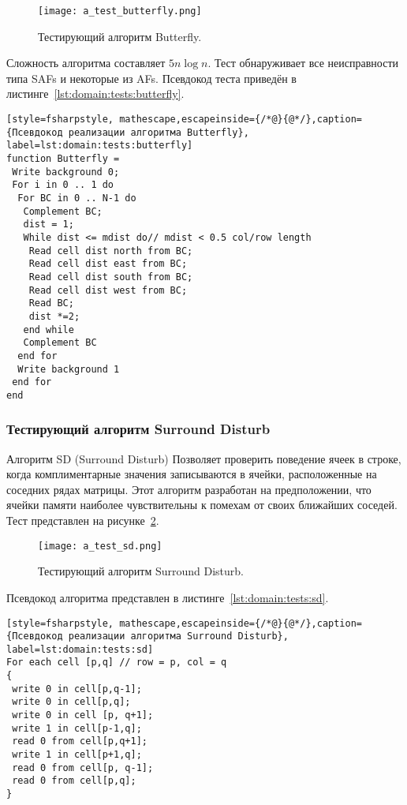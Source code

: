 \begin{figure}[ht]
\centering
  \texttt{[image: a\_test\_butterfly.png]}  
  \caption{ Тестирующий алгоритм Butterfly. }
  \label{fig:domain:tests:butterfly}
\end{figure} 

Сложность алгоритма составляет $ 5n \log n $. Тест обнаруживает все неисправности типа SAFs и некоторые из AFs. Псевдокод теста приведён в листинге~\ref{lst:domain:tests:butterfly}.

\begin{lstlisting}[style=fsharpstyle, mathescape,escapeinside={/*@}{@*/},caption={Псевдокод реализации алгоритма Butterfly}, label=lst:domain:tests:butterfly]
function Butterfly =
 Write background 0;
 For i in 0 .. 1 do
  For BC in 0 .. N-1 do
   Complement BC;
   dist = 1; 
   While dist <= mdist do// mdist < 0.5 col/row length
    Read cell dist north from BC;
    Read cell dist east from BC;
    Read cell dist south from BC;
    Read cell dist west from BC;
    Read BC; 
    dist *=2;
   end while
   Complement BC
  end for
  Write background 1
 end for
end
\end{lstlisting}

\subsubsection{Тестирующий алгоритм Surround Disturb}
\label{sub:domain:tests:sd}
Алгоритм SD (Surround Disturb) Позволяет проверить поведение ячеек в строке, когда комплиментарные значения записываются в ячейки, расположенные на соседних рядах матрицы. Этот алгоритм разработан на предположении, что ячейки памяти наиболее чувствительны к помехам от своих ближайших соседей. Тест представлен на рисунке~\ref{fig:domain:tests:sd}. 

\begin{figure}[ht]
\centering
  \texttt{[image: a\_test\_sd.png]}  
  \caption{ Тестирующий алгоритм Surround Disturb. }
  \label{fig:domain:tests:sd}
\end{figure} 

Псевдокод алгоритма представлен в листинге~\ref{lst:domain:tests:sd}.

\begin{lstlisting}[style=fsharpstyle, mathescape,escapeinside={/*@}{@*/},caption={Псевдокод реализации алгоритма Surround Disturb}, label=lst:domain:tests:sd]
For each cell [p,q] // row = p, col = q
{
 write 0 in cell[p,q-1];
 write 0 in cell[p,q];
 write 0 in cell [p, q+1];
 write 1 in cell[p-1,q];
 read 0 from cell[p,q+1];
 write 1 in cell[p+1,q];
 read 0 from cell[p, q-1];
 read 0 from cell[p,q];
}
\end{lstlisting}

